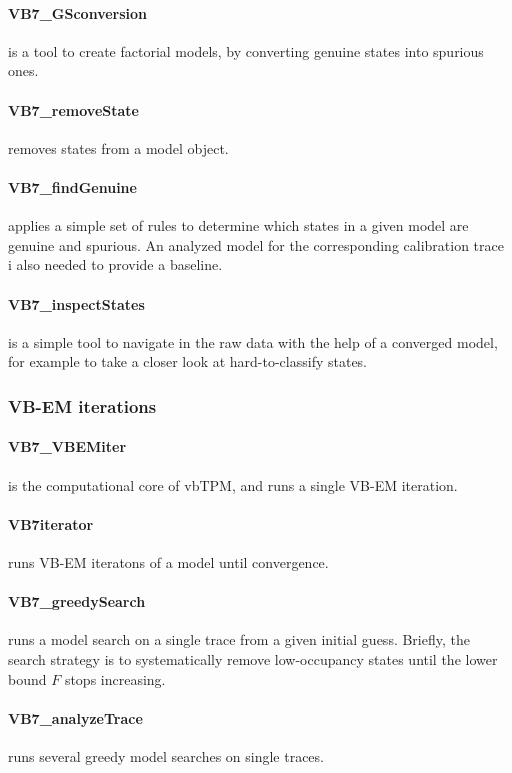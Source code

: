 \paragraph{VB7\_GSconversion}
is a tool to create factorial models, by converting genuine states
into spurious ones.
\paragraph{VB7\_removeState}
removes states from a model object.
\paragraph{VB7\_findGenuine}
applies a simple set of rules to determine which states in a given
model are genuine and spurious. An analyzed model for the
corresponding calibration trace i also needed to provide a baseline.
\paragraph{VB7\_inspectStates} 
is a simple tool to navigate in the raw data with the help of a
converged model, for example to take a closer look at hard-to-classify
states.

\subsubsection{VB-EM iterations}
\paragraph{VB7\_VBEMiter} 
is the computational core of vbTPM, and runs a single VB-EM iteration.
\paragraph{VB7iterator} 
runs VB-EM iteratons of a model until convergence.
\paragraph{VB7\_greedySearch}
runs a model search on a single trace from a given initial
guess. Briefly, the search strategy is to systematically remove
low-occupancy states until the lower bound $F$ stops increasing.
\paragraph{VB7\_analyzeTrace}
runs several greedy model searches on single traces. 

